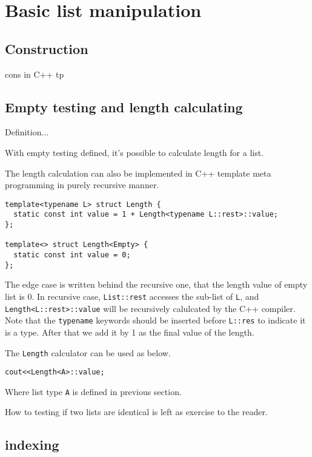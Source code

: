\documentclass{article}
\begin{document}
\section{Basic list manipulation}

\subsection{Construction}

cons in C++ tp

\subsection{Empty testing and length calculating}

Definition...

With empty testing defined, it's possible to calculate length for a list. 

The length calculation can also be implemented in C++ template meta programming in purely recursive
manner.

\lstset{language=C++}
\begin{lstlisting}
template<typename L> struct Length {
  static const int value = 1 + Length<typename L::rest>::value;
};

template<> struct Length<Empty> {
  static const int value = 0;
};
\end{lstlisting}

The edge case is written behind the recursive one, that the length value of empty list is 0.
In recursive case, \verb|List::rest| accesses the sub-list of \verb|L|, and \verb|Length<L::rest>::value|
will be recursively calulcated by the C++ compiler. Note that the \verb|typename| keywords should
be inserted before \verb|L::res| to indicate it is a type. After that we add it by 1 as the final
value of the length.

The \verb|Length| calculator can be used as below.

\begin{lstlisting}
cout<<Length<A>::value;
\end{lstlisting}

Where list type \verb|A| is defined in previous section.

How to testing if two lists are identical is left as exercise to the reader.

\subsection{indexing}
\end{document}
